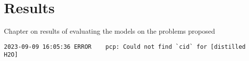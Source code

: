 \chapter{Results}\label{chap:results}
Chapter on results of evaluating the models on the problems proposed





\verb!2023-09-09 16:05:36 ERROR    pcp: Could not find `cid` for [distilled H2O]!

